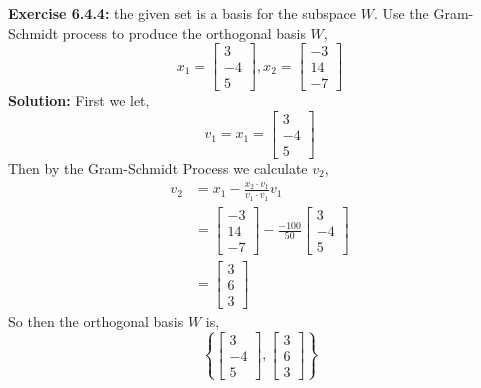 \documentclass{amsart}
\begin{document}
\begin{enumerate}
\noindent\textbf{Exercise 6.4.4: } the given set is a basis for the subspace $W$. Use the Gram-Schmidt process to produce the orthogonal basis $W$,
\begin{equation*}
x_1 = 
\begin{bmatrix}
3\\
-4\\
5
\end{bmatrix},
x_2 = 
\begin{bmatrix}
-3\\
14\\
-7
\end{bmatrix}
\end{equation*} 
\textbf{Solution: } First we let,
\begin{equation*}
v_1 = x_1 = 
\begin{bmatrix}
3\\
-4\\
5
\end{bmatrix}
\end{equation*}
Then by the Gram-Schmidt Process we calculate $v_2$,
\begin{align*}
v_2 &= x_1 - \frac{x_2 \cdot v_1}{v_1 \cdot v_1}v_1\\ 
&=
\begin{bmatrix}
-3\\
14\\
-7
\end{bmatrix}
-
\frac{-100}{50}
\begin{bmatrix}
3\\
-4\\
5
\end{bmatrix}\\
&=
\begin{bmatrix}
3\\
6\\
3
\end{bmatrix}
\end{align*}
So then the orthogonal basis $W$ is,
\begin{equation*}
\left\{
\begin{bmatrix}
3\\
-4\\
5
\end{bmatrix}
,
\begin{bmatrix}
3\\
6\\
3
\end{bmatrix}
\right\}
\end{equation*}
\vspace{1in}




\end{enumerate}
\end{document}
